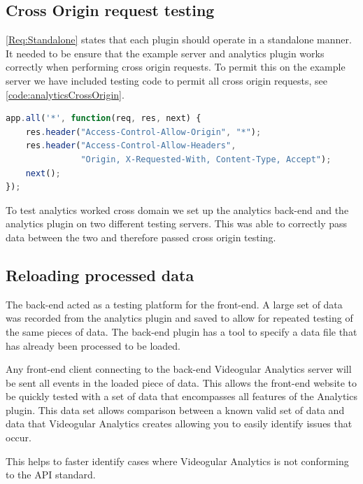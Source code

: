 \subsection{Cross Origin request testing}

\cref{Req:Standalone} states that each plugin should operate in a standalone manner. It needed to be ensure that the example server and analytics plugin works correctly when performing cross origin requests. To permit this on the example server we have included testing code to permit all cross origin requests, see \autoref{code:analyticsCrossOrigin}.

\begin{lstlisting}[language=javascript,caption={Code showing appending Cross Origin headers to all responses}, label={code:analyticsCrossOrigin}]
app.all('*', function(req, res, next) {
	res.header("Access-Control-Allow-Origin", "*");
	res.header("Access-Control-Allow-Headers",
	           "Origin, X-Requested-With, Content-Type, Accept");
	next();
});
\end{lstlisting}

To test analytics worked cross domain we set up the analytics back-end and the analytics plugin on two different testing servers. This was able to correctly pass data between the two and therefore passed cross origin testing.

\subsection{Reloading processed data}
\label{Section:reloading processed data}

The back-end acted as a testing platform for the front-end. A large set of data was recorded from the analytics plugin and saved to allow for repeated testing of the same pieces of data. The back-end plugin has a tool to specify a data file that has already been processed to be loaded.

Any front-end client connecting to the back-end Videogular Analytics server will be sent all events in the loaded piece of data. This allows the front-end website to be quickly tested with a set of data that encompasses all features of the Analytics plugin. This data set allows comparison between a known valid set of data and data that Videogular Analytics creates allowing you to easily identify issues that occur.

This helps to faster identify cases where Videogular Analytics is not conforming to the API standard.

